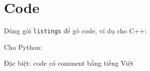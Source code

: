 \section{Code}
Dùng gói \texttt{listings} để gõ code, ví dụ cho C++:


Cho Python:


Đặc biệt: code có comment bằng tiếng Việt
\vietnameselst{}
